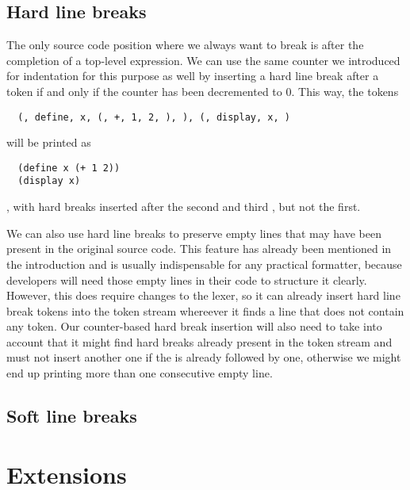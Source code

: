 \subsection{Hard line breaks}
The only source code position where we always want to break
is after the completion of a top-level expression.
We can use the same counter we introduced for indentation for this purpose as well
by inserting a hard line break after a  token if and only if
the counter has been decremented to 0.
This way, the tokens
\begin{verbatim}
  (, define, x, (, +, 1, 2, ), ), (, display, x, )
\end{verbatim}
will be printed as
\begin{verbatim}
  (define x (+ 1 2))
  (display x)
\end{verbatim}
, with hard breaks inserted after the second and third , but not the first.

We can also use hard line breaks to preserve empty lines
that may have been present in the original source code.
This feature has already been mentioned in the introduction and
is usually indispensable for any practical formatter,
because developers will need those empty lines in their code to structure it clearly.
However, this does require changes to the lexer,
so it can already insert hard line break tokens into the token stream
whereever it finds a line that does not contain any token.
Our counter-based hard break insertion will also need to take into account
that it might find hard breaks already present in the token stream
and must not insert another one if the  is already followed by one,
otherwise we might end up printing more than one consecutive empty line.

\subsection{Soft line breaks}

\section{Extensions}

